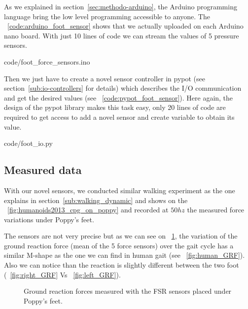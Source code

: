 As we explained in section~\ref{sec:methodo-arduino}, the Arduino programming language bring the low level programming accessible to anyone. The \codename~\ref{code:arduino_foot_sensor} shows that we actually uploaded on each Arduino nano board. With just 10 lines of code we can stream the values of 5 pressure sensors.


    {code/foot_force_sensors.ino}

Then we just have to create a novel sensor controller in pypot (see section~\ref{sub:io-controllers} for details) which describes the I/O communication and get the desired values (see \codename~\ref{code:pypot_foot_sensor}). Here again, the design of the pypot library makes this task easy, only 20 lines of code are required to get access to add a novel sensor and create variable to obtain its value.


    {code/foot_io.py}


\subsection{Measured data} %
With our novel sensors, we conducted similar walking experiment as the one explains in section~\ref{sub:walking_dynamic} and shows on the \figurename~\ref{fig:humanoids2013_cpg_on_poppy} and recorded at $50hz$ the measured force variations under Poppy's feet.

The sensors are not very precise but as we can see on \figurename~\ref{fig:poppy_GRF}, the variation of the ground reaction force (mean of the 5 force sensors) over the gait cycle has a similar M-shape as the one we can find in human gait (see \figurename~\ref{fig:human_GRF}). Also we can notice than the reaction is slightly different between the two foot (\figurename~\ref{fig:right_GRF} Vs \figurename~\ref{fig:left_GRF}).

\begin{figure}[!ht]
\centering
    \hfil
    \caption{Ground reaction forces measured with the FSR sensors placed under Poppy's feet.}
    \label{fig:poppy_GRF}
\end{figure}


